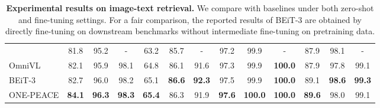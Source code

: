 \documentclass{article}
\newcommand\titlefont[1]{{\usefont{T1}{cinzeldecorativebold}{m}{n}#1}}
\newcommand{\modelname}{\titlefont{ONE-PEACE}\xspace}
\begin{document}
\begin{table*}[t]
\begin{tabular}{lcccccc|cccccc}
  & 81.8 & 95.2 & -
  & 63.2 & 85.7 & -
  & 97.2 & 99.9 & -
  & 87.9 & 98.1 & -
  \\
  OmniVL~\cite{omnivl}
  & 82.1 & 95.9 & 98.1
  & 64.8 & 86.1 & 91.6
  & 97.3 & 99.9 & \textbf{100.0}
  & 87.9 & 97.8 & 99.1
  \\
  BEiT-3~\cite{beit3}
  & 82.7 & 96.0 & 98.2
  & 65.1 & \textbf{86.6} & \textbf{92.3}
  & 97.5 & 99.9 & \textbf{100.0}
  & 89.1 & \textbf{98.6} & \textbf{99.3}
  \\
  \modelname
  & \textbf{84.1} & \textbf{96.3} & \textbf{98.3}
  & \textbf{65.4} & 86.3 & 91.9
  &\textbf{97.6} & \textbf{100.0} & \textbf{100.0}
  &\textbf{89.6} & 98.0 & 99.1
  \\
\end{tabular}
\caption{\textbf{Experimental results on image-text retrieval.} We compare with baselines under both zero-shot and fine-tuning settings. For a fair comparison, the reported results of BEiT-3 are obtained by directly fine-tuning on downstream benchmarks without intermediate fine-tuning on pretraining data.}
\label{tb:vl-zeroshot}
\end{table*} 
\end{document}
